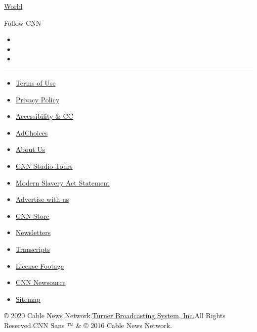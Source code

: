 \href{/world}{World}

Follow CNN

\begin{itemize}
\item
\item
\item
\end{itemize}

\begin{center}\rule{0.5\linewidth}{\linethickness}\end{center}

\begin{itemize}
\tightlist
\item
  \href{/terms}{Terms of Use}
\item
  \href{/privacy}{Privacy Policy}
\item
  \href{/accessibility}{Accessibility \& CC}
\item
  \protect\hyperlink{}{AdChoices}
\item
  \href{/about}{About Us}
\item
  \href{/tour}{CNN Studio Tours}
\item
  \href{/msa}{Modern Slavery Act Statement}
\item
  \href{https://commercial.cnn.com}{Advertise with us}
\item
  \href{//store.cnn.com}{CNN Store}
\item
  \href{/newsletters}{Newsletters}
\item
  \href{/transcripts}{Transcripts}
\item
  \href{/collection}{License Footage}
\item
  \href{http://cnnnewsource.com}{CNN Newsource}
\item
  \href{https://www.cnn.com/sitemap.html}{Sitemap}
\end{itemize}

© 2020 Cable News Network.\href{//www.turner.com}{Turner Broadcasting
System, Inc.}All Rights Reserved.CNN Sans ™ \& © 2016 Cable News
Network.
